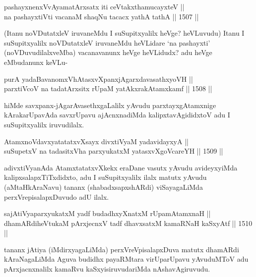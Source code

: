 \begin{shl}
pashayxnenxVvAyamatArx\s \s satx iti ceVtakxthamucayxteV || \\
na pashayxtiVti vacanaM shaqNu tacacx yathA tathA \hfill || 1507 ||  
\end{shl}

\begin{artha}
(Itanu noVDutatxleV iruvaneMdu I suSupitxyalilx heVge? heVLuvudu) Itanu I suSupitxyalilx noVDutatxleV iruvaneMdu heVLidare `na pashayxti' (noVDuvudilalxveMba) vacanavanunx heVge heVLidudx? adu heVge eMbudanunx keVLu-
\end{artha}


\begin{shl}
purA yadaBavanomxVhAtasxvXpanxjAgarxdavasathxyoVH || \\
parxtiVcoV na tadatArxsitx rUpaM yatAkxrakAtamxkamf \hfill || 1508 ||  
\end{shl}

\begin{artha}
hiMde savxpanx-jAgarAvasethxgaLalilx yAvudu parxtayxgAtamxnige kArakarUpavAda savxrUpavu ajAcnxnadiMda kalipxtavAgididxtoV adu I suSupitxyalilx iruvudilalx.
\end{artha}


\begin{shl}
AtamxnoV\s davxyatatatxvXsayx divxtiVyaM yadavidayxyA ||  \\
suSupetxV na tadasitxVha parxyukatxM yatasxvXgoVcareYH \hfill || 1509 ||  
\end{shl}

\begin{artha}
adivxtiVyanAda AtamxtatatxvXkekx eraDane vasutx yAvudu avideyxyiMda kalipxsalapxTiTxdidxto, adu I suSupitxyalilx ilalx matutx yAvudu (aMtaHkAraNavu) tananx (shabadxsapxshARdi) viSayagaLiMda perxVrepisalapxDuvudo adU ilalx.
\end{artha}

\begin{shl}
sajAtiVyaparxyukatxM yadf budadhxyXnatxM rUpamAtamxnaH || \\
dhamARdiheVtukaM pArxjecnxV tadf dhavxsatxM kamaRNaH kaSxyAtf \hfill || 1510 || 
\end{shl}

\begin{artha}
tananx jAtiya (iMdirxyagaLiMda) perxVreVpisalapxDuva matutx dhamARdi kAraNagaLiMda Aguva budidhx payaRMtara virUparUpavu yAvuduMToV adu pArxjacnxnalilx kamaRvu kaSxyisiruvudariMda nAshavAgiruvudu.
\end{artha}

